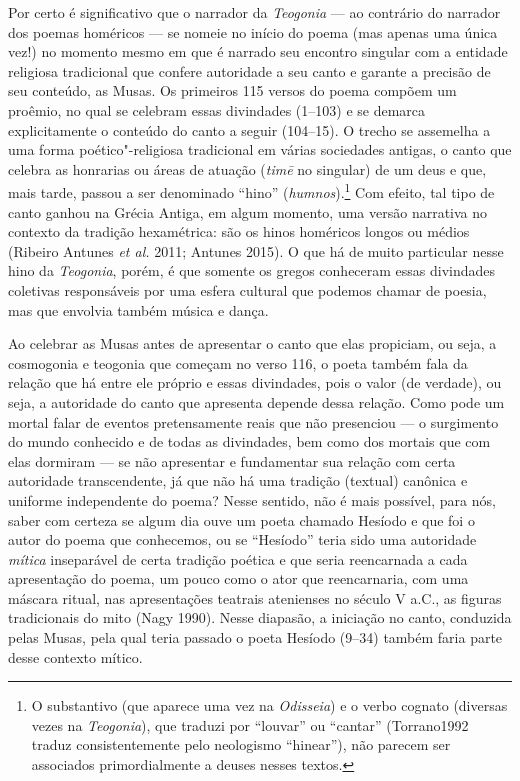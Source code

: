 
Por certo é significativo que o narrador da \emph{Teogonia} --- ao
contrário do narrador dos poemas homéricos --- se nomeie no início do
poema (mas apenas uma única vez!) no momento mesmo em que é narrado seu
encontro singular com a entidade religiosa tradicional que confere
autoridade a seu canto e garante a precisão de seu conteúdo, as Musas.
Os primeiros 115 versos do poema compõem um proêmio, no qual se celebram
essas divindades (1--103) e se demarca explicitamente o conteúdo do canto
a seguir (104--15). O trecho se assemelha a uma forma poético"-religiosa
tradicional em várias sociedades antigas, o canto que celebra as
honrarias ou áreas de atuação (\emph{timē} no singular) de um deus e
que, mais tarde, passou a ser denominado ``hino''
(\emph{humnos}).\footnote{O substantivo (que aparece uma vez na
  \emph{Odisseia}) e o verbo cognato (diversas vezes na
  \emph{Teogonia}), que traduzi por ``louvar'' ou ``cantar''
  (Torrano1992 traduz consistentemente pelo neologismo ``hinear''), não
  parecem ser associados primordialmente a deuses nesses textos.} Com
efeito, tal tipo de canto ganhou na Grécia Antiga, em algum momento, uma
versão narrativa no contexto da tradição hexamétrica: são os hinos
homéricos longos ou médios (Ribeiro Antunes \emph{et al.} 2011; Antunes
2015). O que há de muito particular nesse hino da \emph{Teogonia},
porém, é que somente os gregos conheceram essas divindades coletivas
responsáveis por uma esfera cultural que podemos chamar de poesia, mas
que envolvia também música e dança.

Ao celebrar as Musas antes de apresentar o canto que elas propiciam, ou
seja, a cosmogonia e teogonia que começam no verso 116, o poeta também
fala da relação que há entre ele próprio e essas divindades, pois o
valor (de verdade), ou seja, a autoridade do canto que apresenta depende
dessa relação. Como pode um mortal falar de eventos pretensamente reais
que não presenciou --- o surgimento do mundo conhecido e de todas as
divindades, bem como dos mortais que com elas dormiram --- se não
apresentar e fundamentar sua relação com certa autoridade transcendente,
já que não há uma tradição (textual) canônica e uniforme independente do
poema? Nesse sentido, não é mais possível, para nós, saber com certeza
se algum dia ouve um poeta chamado Hesíodo e que foi o autor do poema
que conhecemos, ou se ``Hesíodo'' teria sido uma autoridade
\emph{mítica} inseparável de certa tradição poética e que seria
reencarnada a cada apresentação do poema, um pouco como o ator que
reencarnaria, com uma máscara ritual, nas apresentações teatrais
atenienses no século V a.C., as figuras tradicionais do mito (Nagy
1990). Nesse diapasão, a iniciação no canto, conduzida pelas Musas, pela
qual teria passado o poeta Hesíodo (9--34) também faria parte desse
contexto mítico.

